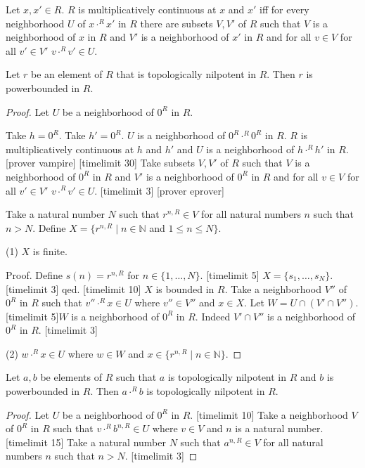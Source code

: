 \documentclass[english,11pt]{article}
\newcommand{\powers}[2]{\{{#1}^{n,#2} \mid n \in \mathbb{N}\}}
\newcommand{\Seq}[2]{\{#1,\dots,#2\}}
\newcommand{\FinSet}[3]{\{#1_{#2},\dots,#1_{#3}\}}
\begin{document}
\begin{definition}
Let $x,x' \in R$. $R$ is multiplicatively continuous at $x$ and $x'$ iff
for every neighborhood $U$ of $x \cdot^{R} x'$ in $R$
there are subsets $V,V'$ of $R$ such that 
$V$ is a neighborhood of $x$ in $R$ and $V'$ is a neighborhood
of $x'$ in $R$ and for all $v \in V$ for all $v' \in V'$ 
$v \cdot^{R} v' \in U$.
\end{definition}

\begin{forthel}

\begin{theorem}
Let $r$ be an element of $R$ that is topologically nilpotent in $R$.
Then $r$ is powerbounded in $R$.
\end{theorem}
\begin{proof}

Let $U$ be a neighborhood of $0^{R}$ in $R$.

Take $h = 0^{R}$. Take $h' = 0^{R}$.
$U$ is a neighborhood of $0^{R} \cdot^{R} 0^{R}$ in $R$.
$R$ is multiplicatively continuous at $h$ and $h'$ and
$U$ is a neighborhood of $h \cdot^{R} h'$ in $R$.
[prover vampire]
[timelimit 30]
Take subsets $V,V'$ of $R$ such that
$V$ is a neighborhood of $0^{R}$ in $R$ and
$V'$ is a neighborhood of $0^{R}$ in $R$ and
for all $v \in V$ for all $v' \in V'$ 
$v \cdot^{R} v' \in U$.  
[timelimit 3]
[prover eprover]

Take a natural number $N$ such that $r^{n,R} \in V$ 
for all natural numbers $n$ such that $n > N$.
Define $X = \{r^{n,R} \mid n \in \mathbb{N}$ and $1 \leq n \leq N\}$.

(1) $X$ is finite.

Proof. Define $s(n)= r^{n,R}$ for $n \in \Seq{1}{N}$.
[timelimit 5]
$X = \FinSet{s}{1}{N}$.
[timelimit 3]
qed.
[timelimit 10]
$X$ is bounded in $R$.
Take a neighborhood $V''$ of $0^{R}$ in $R$ such that
$v'' \cdot^{R} x \in U$ where $v'' \in V''$ and $x \in X$.
Let $W = U \cap (V' \cap V'')$. 
[timelimit 5]$W$ is a neighborhood
of $0^{R}$ in $R$. Indeed $V' \cap V''$ is a neighborhood
of $0^{R}$ in $R$.
[timelimit 3]

(2) $w \cdot^{R} x \in U$ where $w \in W$ and $x \in \powers{r}{R}$.
    
\end{proof}

\begin{lemma}
Let $a,b$ be elements of $R$ such that $a$ is topologically nilpotent in $R$ and
$b$ is powerbounded in $R$.
Then $a\cdot^{R} b$ is topologically nilpotent in $R$.
\end{lemma}
\begin{proof}
Let $U$ be a neighborhood of $0^{R}$ in $R$.
[timelimit 10]
Take a neighborhood $V$ of $0^{R}$ in $R$ such that
$v \cdot^{R} b^{n,R} \in U$ where $v \in V$ and $n$ is a natural number.
[timelimit 15]
Take a natural number $N$ such that
$a^{n,R} \in V$ for all natural numbers $n$ such that $n > N$.
[timelimit 3]


\end{proof}
\end{forthel}
\end{document}
